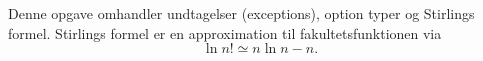 Denne opgave omhandler undtagelser (exceptions), option typer og Stirlings formel. Stirlings formel er en approximation til fakultetsfunktionen via $$\ln n! \simeq n \ln n - n.$$